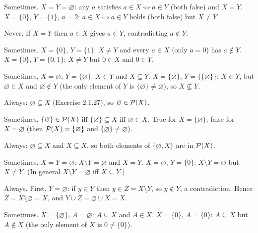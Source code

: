  Sometimes. $X=Y=\varnothing$: any $a$ satisfies $a\in X\Leftrightarrow a\in Y$ (both false) and $X=Y$. $X=\{0\}$, $Y=\{1\}$, $a=2$: $a\in X\Leftrightarrow a\in Y$ holds (both false) but $X\ne Y$.

 Never. If $X=Y$ then $a\in X$ gives $a\in Y$, contradicting $a\notin Y$.

 Sometimes. $X=\{0\}$, $Y=\{1\}$: $X\ne Y$ and every $a\in X$ (only $a=0$) has $a\notin Y$. $X=\{0\}$, $Y=\{0,1\}$: $X\ne Y$ but $0\in X$ and $0\in Y$.

 Sometimes. $X=\varnothing$, $Y=\{\varnothing\}$: $X\in Y$ and $X\subseteq Y$. $X=\{\varnothing\}$, $Y=\{\{\varnothing\}\}$: $X\in Y$, but $\varnothing\in X$ and $\varnothing\notin Y$ (the only element of $Y$ is $\{\varnothing\}\ne\varnothing$), so $X\nsubseteq Y$.

 Always: $\varnothing\subseteq X$ (Exercise 2.1.27), so $\varnothing\in\mathcal{P}(X)$.

 Sometimes. $\{\varnothing\}\in\mathcal{P}(X)$ iff $\{\varnothing\}\subseteq X$ iff $\varnothing\in X$. True for $X=\{\varnothing\}$; false for $X=\varnothing$ (then $\mathcal{P}(X)=\{\varnothing\}$ and $\{\varnothing\}\ne\varnothing$).

 Always: $\varnothing\subseteq X$ and $X\subseteq X$, so both elements of $\{\varnothing,X\}$ are in $\mathcal{P}(X)$.

 Sometimes. $X=Y=\varnothing$: $X\setminus Y=\varnothing$ and $X=Y$. $X=\varnothing$, $Y=\{0\}$: $X\setminus Y=\varnothing$ but $X\ne Y$. (In general $X\setminus Y=\varnothing$ iff $X\subseteq Y$.)

 Always. First, $Y=\varnothing$: if $y\in Y$ then $y\in Z=X\setminus Y$, so $y\notin Y$, a contradiction. Hence $Z=X\setminus\varnothing=X$, and $Y\cup Z=\varnothing\cup X=X$.

 Sometimes. $X=\{\varnothing\}$, $A=\varnothing$: $A\subseteq X$ and $A\in X$. $X=\{0\}$, $A=\{0\}$: $A\subseteq X$ but $A\notin X$ (the only element of $X$ is $0\ne\{0\}$).
